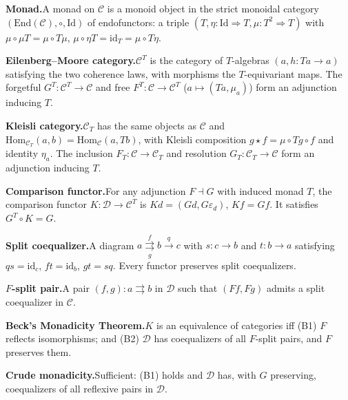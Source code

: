 \begin{formalrestatement}

\textbf{Monad.}\quad A monad on $\mathcal{C}$ is a monoid object in the
strict monoidal category $(\mathrm{End}(\mathcal{C}), \circ, \mathrm{Id})$
of endofunctors: a triple $(T, \eta: \mathrm{Id} \Rightarrow T,
\mu: T^2 \Rightarrow T)$ with $\mu \circ \mu T = \mu \circ T\mu$,
$\mu \circ \eta T = \mathrm{id}_T = \mu \circ T\eta$.

\textbf{Eilenberg--Moore category.}\quad $\mathcal{C}^T$ is the category
of $T$-algebras $(a, h: Ta \to a)$ satisfying the two coherence laws, with
morphisms the $T$-equivariant maps. The forgetful $G^T: \mathcal{C}^T \to
\mathcal{C}$ and free $F^T: \mathcal{C} \to \mathcal{C}^T$ ($a \mapsto
(Ta, \mu_a)$) form an adjunction inducing $T$.

\textbf{Kleisli category.}\quad $\mathcal{C}_T$ has the same objects as
$\mathcal{C}$ and $\mathrm{Hom}_{\mathcal{C}_T}(a,b) = \mathrm{Hom}_\mathcal{C}(a, Tb)$,
with Kleisli composition $g \star f = \mu \circ Tg \circ f$ and
identity $\eta_a$. The inclusion $F_T: \mathcal{C} \to \mathcal{C}_T$ and
resolution $G_T: \mathcal{C}_T \to \mathcal{C}$ form an adjunction inducing $T$.

\textbf{Comparison functor.}\quad For any adjunction $F \dashv G$ with
induced monad $T$, the comparison functor $K: \mathcal{D} \to \mathcal{C}^T$
is $Kd = (Gd, G\varepsilon_d)$, $Kf = Gf$. It satisfies $G^T \circ K = G$.

\textbf{Split coequalizer.}\quad A diagram $a \overset{f}{\underset{g}{\rightrightarrows}} b \overset{q}{\to} c$
with $s: c \to b$ and $t: b \to a$ satisfying $qs = \mathrm{id}_c$, $ft = \mathrm{id}_b$,
$gt = sq$. Every functor preserves split coequalizers.

\textbf{$F$-split pair.}\quad A pair $(f,g): a \rightrightarrows b$ in
$\mathcal{D}$ such that $(Ff, Fg)$ admits a split coequalizer in $\mathcal{C}$.

\textbf{Beck's Monadicity Theorem.}\quad $K$ is an equivalence of
categories iff (B1) $F$ reflects isomorphisms; and (B2) $\mathcal{D}$ has
coequalizers of all $F$-split pairs, and $F$ preserves them.

\textbf{Crude monadicity.}\quad Sufficient: (B1) holds and $\mathcal{D}$
has, with $G$ preserving, coequalizers of all reflexive pairs in $\mathcal{D}$.

\end{formalrestatement}
